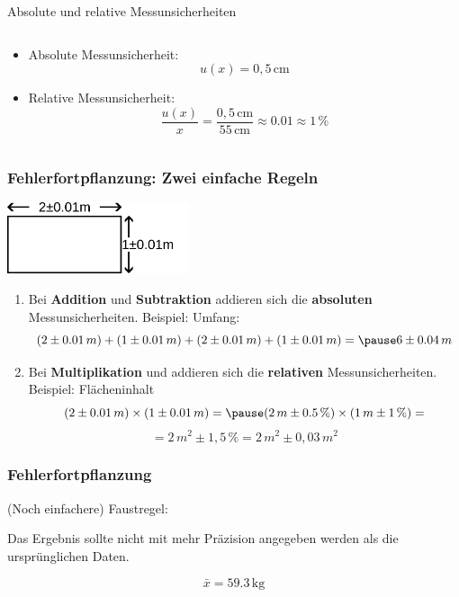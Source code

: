 \documentclass{beamer}
\begin{document}
\begin{frame}{Absolute und relative Messunsicherheiten}
\begin{columns}[c]
        \begin{column}{7cm}

\begin{itemize}
\item
Absolute Messunsicherheit: 
\[
u(x) = 0,5\,\text{cm}
\]

\item
Relative Messunsicherheit: 
\[
\frac{u(x)}{x} = \frac{0,5\,\text{cm}}{55\,\text{cm}} \approx 0.01 \approx 1\,\%  
\]



\end{itemize}
        
    \end{column}

\end{columns}

\end{frame}



\begin{frame}
\frametitle{Fehlerfortpflanzung: Zwei einfache Regeln}


\begin{center}
    \includegraphics[width=0.4\textwidth]{Rechteck.png}
\end{center}

\begin{enumerate}
    \item 
Bei \textbf{Addition} und \textbf{Subtraktion} addieren sich die \textbf{absoluten} Messunsicherheiten. Beispiel: Umfang: 
\[
(2\pm 0.01\,m) + (1\pm 0.01\,m) + (2\pm 0.01\,m) + (1\pm 0.01\,m) = \pause 6 \pm 0.04\,m
\]


        \item 
Bei \textbf{Multiplikation} und  addieren sich die \textbf{relativen} Messunsicherheiten. Beispiel: Flächeninhalt 
\[
(2\pm 0.01\,m) \times (1 \pm 0.01\,m) = \pause (2\,m\pm 0.5\,\%)  \times (1\,m \pm 1\,\%) =
\]
\pause
\[
= 2\,m^2 \pm 1,5\,\% = 2\,m^2 \pm 0,03\,m^2
\]



\end{enumerate}


\end{frame}

\begin{frame}
\frametitle{Fehlerfortpflanzung}

(Noch einfachere) Faustregel:

Das Ergebnis sollte nicht mit mehr Präzision angegeben werden als die ursprünglichen Daten. 

\pause

\[
\bar{x} = 59.3\,\text{kg}
\]

\end{frame}
\end{document}
